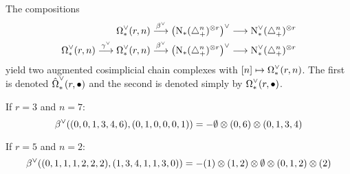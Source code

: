 The compositions
\begin{align*}
	\operatorname{\Omega}^{\vee}_{*}(r,n)&\overset{\beta^\vee}{\longrightarrow} \left(\operatorname{N}_{*}(\triangle_{+}^n)^{\otimes r}\right)^\vee \longrightarrow \operatorname{N}^\vee_{*}(\triangle_{+}^n)^{\otimes r}
	\\
	\operatorname{\Omega}^{\vee}_{*}(r,n)\overset{\gamma^\vee}{\longrightarrow}	\operatorname{\Omega}^{\vee}_{*}(r,n)&\overset{\beta^\vee}{\longrightarrow} \left(\operatorname{N}_{*}(\triangle_{+}^n)^{\otimes r}\right)^\vee \longrightarrow \operatorname{N}^\vee_{*}(\triangle_{+}^n)^{\otimes r}
\end{align*}
	yield two augmented cosimplicial chain complexes with $[n]\mapsto \operatorname{\Omega}^{\vee}_{*}(r,n)$. The first is denoted $\hat{\operatorname{\Omega}}^{\vee}_{*}(r,\bullet)$ and the second is denoted simply by $\operatorname{\Omega}^{\vee}_{*}(r,\bullet)$.
\begin{example}\label{example:betadual3} If $r=3$ and $n=7$:
\[
		\beta^\vee((0,0,1,3,4,6),(0,1,0,0,0,1)) = -\emptyset \otimes (0,6) \otimes (0,1,3,4)
	\]
	\end{example}
	\begin{example}\label{example:betadual5} If $r=5$ and $n=2$:
	\[
		\beta^\vee((0,1,1,1,2,2,2),(1,3,4,1,1,3,0)) = -(1) \otimes (1,2) \otimes \emptyset \otimes (0,1,2) \otimes (2)
	\]
	\end{example}

